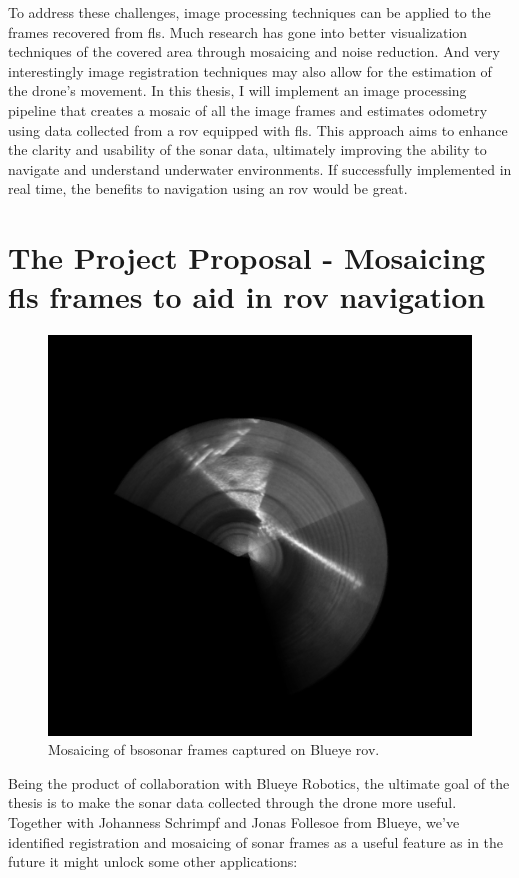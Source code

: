 To address these challenges, image processing techniques can be applied to the frames recovered from \acrshort{fls}. Much research has gone into better visualization techniques of the covered area through mosaicing and noise reduction. And very interestingly image registration techniques may also allow for the estimation of the drone’s movement. In this thesis, I will implement an image processing pipeline that creates a mosaic of all the image frames and estimates odometry using data collected from a \acrfull{rov} equipped with \acrshort{fls}. This approach aims to enhance the clarity and usability of the \acrshort{sonar} data, ultimately improving the ability to navigate and understand underwater environments. If successfully implemented in real time, the benefits to navigation using an \acrfull{rov} would be great. 

\section{The Project Proposal - Mosaicing \acrshort{fls} frames to aid in \acrshort{rov} navigation}

\begin{figure}[H]
  \centering
  \includegraphics[width=.7\textwidth]{figures/example-output.png}
  \caption[Example mosaicing.]{Mosaicing of \acrshort{bsosonar} frames captured on Blueye \acrshort{rov}.}
\end{figure}

Being the product of collaboration with Blueye Robotics, the ultimate goal of the thesis is to make the \acrshort{sonar} data collected through the drone more useful. Together with Johanness Schrimpf and Jonas Follesoe from Blueye, we've identified registration and mosaicing of \acrshort{sonar} frames as a useful feature as in the future it might unlock some other applications:

